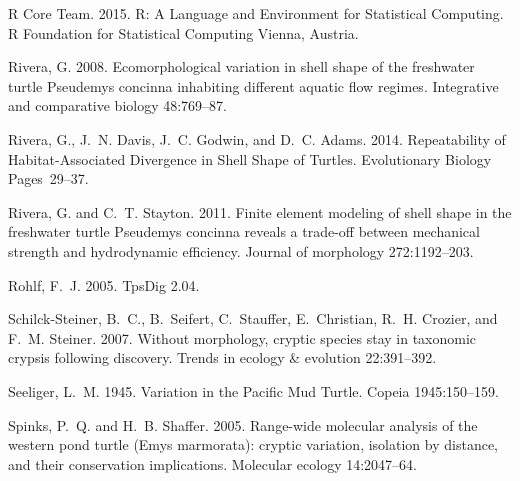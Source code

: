 \documentclass[12pt,letterpaper]{article}
\begin{document}
\begin{thebibliography}{77}
        {R Core Team}. 2015. R: A Language and Environment for Statistical Computing. R
        Foundation for Statistical Computing Vienna, Austria.

        Rivera, G. 2008. {Ecomorphological variation in shell shape of the freshwater
        turtle Pseudemys concinna inhabiting different aquatic flow regimes.}
        Integrative and comparative biology 48:769--87.

        Rivera, G., J.~N. Davis, J.~C. Godwin, and D.~C. Adams. 2014. {Repeatability of
        Habitat-Associated Divergence in Shell Shape of Turtles}. Evolutionary
        Biology Pages~29--37.

        Rivera, G. and C.~T. Stayton. 2011. {Finite element modeling of shell shape in
          the freshwater turtle Pseudemys concinna reveals a trade-off between
        mechanical strength and hydrodynamic efficiency.} Journal of morphology
        272:1192--203.

        Rohlf, F.~J. 2005. {TpsDig 2.04}.

        Schilck-Steiner, B.~C., B.~Seifert, C.~Stauffer, E.~Christian, R.~H. Crozier,
        and F.~M. Steiner. 2007. {Without morphology, cryptic species stay in
        taxonomic crypsis following discovery}. Trends in ecology \& evolution
        22:391--392.

        Seeliger, L.~M. 1945. {Variation in the Pacific Mud Turtle}. Copeia
        1945:150--159.

        Spinks, P.~Q. and H.~B. Shaffer. 2005. {Range-wide molecular analysis of the
          western pond turtle (Emys marmorata): cryptic variation, isolation by
        distance, and their conservation implications.} Molecular ecology
        14:2047--64.


\end{thebibliography}
\end{document}
